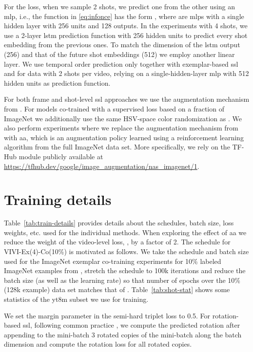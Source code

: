 \documentclass[10pt,twocolumn,letterpaper]{article}
\begin{document}
{For the  loss, when we sample 2 shots, we predict one from the other using an \gls{mlp}, i.e., the function  in \eqref{eq:infonce} has the form , where  are \glspl{mlp} with a single hidden layer with 256 units and 128 outputs.
In the experiments with 4 shots, we use a 2-layer \gls{lstm} prediction function with 256 hidden units to predict every shot embedding from the previous ones. To match the dimension of the \gls{lstm} output (256) and that of the future shot embeddings (512) we employ another linear layer. 
We use temporal order prediction only together with exemplar-based \gls{ssl} and for data with 2 shots per video, relying on a single-hidden-layer \gls{mlp} with 512 hidden units as prediction function.

For both frame and shot-level \gls{ssl} approaches we use the augmentation mechanism from \cite{szegedy2015going}. For models co-trained with a supervised loss based on a fraction of ImageNet we additionally use the same HSV-space color randomization as \cite{zhai2019s4l}.
We also perform experiments where we replace the augmentation mechanism from \cite{szegedy2015going} with \gls{aa}, which is an augmentation policy learned using a reinforcement learning algorithm from the full ImageNet data set. More specifically, we rely on the TF-Hub module publicly available at \url{https://tfhub.dev/google/image_augmentation/nas_imagenet/1}.

\section{Training details}

Table~\ref{tab:train-details} provides details about the schedules, batch size, loss weights, etc. used for the individual methods. When exploring the effect of \gls{aa} we reduce the weight of the video-level loss, , by a factor of 2. The schedule for VIVI-Ex(4)-Co(10\%) is motivated as follows. We take the schedule and batch size used for the ImageNet exemplar co-training experiments for 10\% labeled ImageNet examples from \cite{zhai2019s4l}, stretch the schedule to 100k iterations and reduce the batch size (as well as the learning rate) so that number of epochs over the 10\% (128k example) data set matches that of \cite{zhai2019s4l}. Table~\ref{tab:shot-stat} shows some statistics of the \gls{yt8m} subset we use for training.

We set the margin parameter in the semi-hard triplet loss \cite{schroff2015facenet} to 0.5. For rotation-based \gls{ssl}, following common practice \cite{gidaris2018unsupervised, kolesnikov2019revisiting}, we compute the predicted rotation after appending to the mini-batch 3 rotated copies of the mini-batch along the batch dimension and compute the rotation loss for all rotated copies.

}
\end{document}
